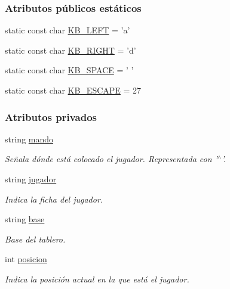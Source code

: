 \subsubsection*{Atributos públicos estáticos}
\begin{DoxyCompactItemize}
\item 
static const char \hyperlink{classMando_a61277e93015f5d44d37416f1475be542}{K\-B\-\_\-\-L\-E\-F\-T} = 'a'
\item 
static const char \hyperlink{classMando_a75b32aa31a64931f62c5737b8f09bf39}{K\-B\-\_\-\-R\-I\-G\-H\-T} = 'd'
\item 
static const char \hyperlink{classMando_ade68606cf2abf043c08e281d1531c78a}{K\-B\-\_\-\-S\-P\-A\-C\-E} = ' '
\item 
static const char \hyperlink{classMando_a3c4e7465d5b25fcaf8f3b50b444421a3}{K\-B\-\_\-\-E\-S\-C\-A\-P\-E} = 27
\end{DoxyCompactItemize}
\subsubsection*{Atributos privados}
\begin{DoxyCompactItemize}
\item 
string \hyperlink{classMando_a156e71bce6ea523dccbce03021bee4dd}{mando}
\begin{DoxyCompactList}\small\item\em Señala dónde está colocado el jugador. Representada con '$^\wedge$'. \end{DoxyCompactList}\item 
string \hyperlink{classMando_ab4791c4f5bb306c1bbcf95047e010163}{jugador}
\begin{DoxyCompactList}\small\item\em Indica la ficha del jugador. \end{DoxyCompactList}\item 
string \hyperlink{classMando_ad914a93d7fb6c085a26d5d70bbb7fecd}{base}
\begin{DoxyCompactList}\small\item\em Base del tablero. \end{DoxyCompactList}\item 
int \hyperlink{classMando_a7971a6eaa8b936977be7460ffa28530f}{posicion}
\begin{DoxyCompactList}\small\item\em Indica la posición actual en la que está el jugador. \end{DoxyCompactList}\end{DoxyCompactItemize}


